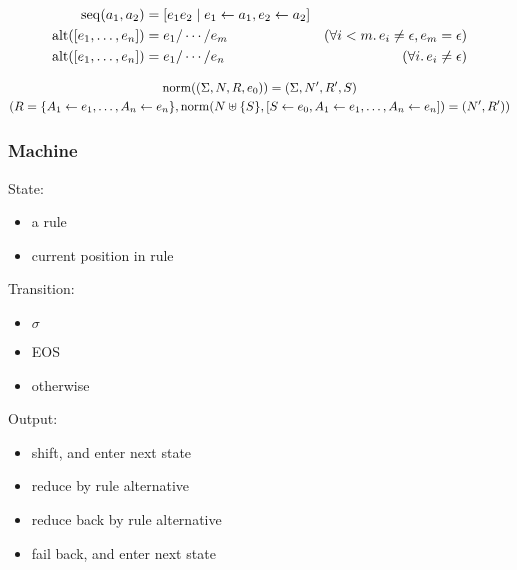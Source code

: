 \begin{align*}
  \mathop{\mathrm{seq}}(a_1, a_2) &= [e_1 e_2 \mid e_1 \gets a_1, e_2 \gets a_2] \\
  \mathop{\mathrm{alt}}([e_1, \ldots, e_n]) &= e_1 / \cdots / e_m &(\forall i < m\ldotp e_i \neq \epsilon, e_m = \epsilon) \\
  \mathop{\mathrm{alt}}([e_1, \ldots, e_n]) &= e_1 / \cdots / e_n &(\forall i\ldotp e_i \neq \epsilon)
\end{align*}

\begin{gather*}
  \mathop{\mathrm{norm}}((\Sigma, N, R, e_0)) = (\Sigma, N', R', S) \\
  (R = \{A_1 \gets e_1, \ldots, A_n \gets e_n\}, \mathop{\mathrm{norm}}(N \uplus \{S\}, [S \gets e_0, A_1 \gets e_1, \ldots, A_n \gets e_n]) = (N', R'))
\end{gather*}

\subsubsection{Machine}

State:
\begin{itemize}
  \item a rule
  \item current position in rule
\end{itemize}

Transition:
\begin{itemize}
  \item $\sigma$
  \item EOS
  \item otherwise
\end{itemize}

Output:
\begin{itemize}
  \item shift, and enter next state
  \item reduce by rule alternative
  \item reduce back by rule alternative
  \item fail back, and enter next state
\end{itemize}
